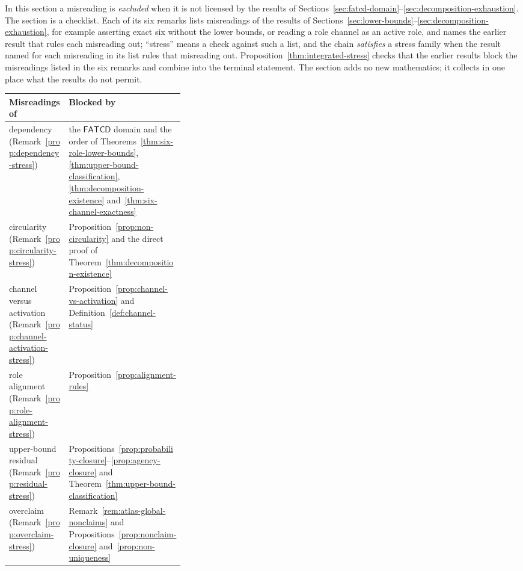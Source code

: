 \documentclass[11pt]{article}
\theoremstyle{definition}
\newcommand{\FATCD}{\ensuremath{\mathsf{FATCD}}}
\begin{document}
In this section a misreading is \emph{excluded} when it is not licensed by the
results of
Sections~\ref{sec:fatcd-domain}--\ref{sec:decomposition-exhaustion}.
The section is a checklist. Each of its six remarks lists misreadings of
the results of Sections~\ref{sec:lower-bounds}--\ref{sec:decomposition-exhaustion},
for example asserting exact six without the lower bounds, or reading a
role channel as an active role, and names the earlier result that rules
each misreading out; ``stress'' means a check against such a list, and the
chain \emph{satisfies} a stress family when the result named for each
misreading in its list rules that misreading out.
Proposition~\ref{thm:integrated-stress} checks that the earlier results
block the misreadings listed in the six remarks and combine into the terminal statement.
The section adds no new mathematics; it collects in one place what the
results do not permit.

\begin{center}
\small
\begin{tabularx}{\linewidth}{@{}>{\raggedright\arraybackslash}p{0.34\linewidth}>{\raggedright\arraybackslash}X@{}}
\toprule
Misreadings of & Blocked by \\
\midrule
dependency (Remark~\ref{prop:dependency-stress}) & the \FATCD{} domain and the order of Theorems~\ref{thm:six-role-lower-bounds}, \ref{thm:upper-bound-classification}, \ref{thm:decomposition-existence} and~\ref{thm:six-channel-exactness} \\
circularity (Remark~\ref{prop:circularity-stress}) & Proposition~\ref{prop:non-circularity} and the direct proof of Theorem~\ref{thm:decomposition-existence} \\
channel versus activation (Remark~\ref{prop:channel-activation-stress}) & Proposition~\ref{prop:channel-vs-activation} and Definition~\ref{def:channel-status} \\
role alignment (Remark~\ref{prop:role-alignment-stress}) & Proposition~\ref{prop:alignment-rules} \\
upper-bound residual (Remark~\ref{prop:residual-stress}) & Propositions~\ref{prop:probability-closure}--\ref{prop:agency-closure} and Theorem~\ref{thm:upper-bound-classification} \\
overclaim (Remark~\ref{prop:overclaim-stress}) & Remark~\ref{rem:atlas-global-nonclaims} and Propositions~\ref{prop:nonclaim-closure} and~\ref{prop:non-uniqueness} \\
\bottomrule
\end{tabularx}
\end{center}
\end{document}
